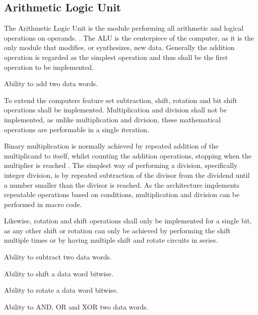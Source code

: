 \subsection{Arithmetic Logic Unit}
The Arithmetic Logic Unit is the module performing all arithmetic and logical operations on operands. \cite{vonneuman1945a}. The ALU is the centerpiece of the computer, as it is the only module that modifies, or synthesizes, new data.
Generally the addition operation is regarded as the simplest operation and thus shall be the first operation to be implemented.

\begin{turing-requirement}
  Ability to add two data words.
\end{turing-requirement}

To extend the computers feature set subtraction, shift, rotation and bit shift operations shall be implemented. Multiplication and division shall not be implemented, as unlike multiplication and division, these mathematical operations are performable in a single iteration. 

Binary multiplication is normally achieved by repeated addition of the multiplicand to itself, whilst counting the addition operations, stopping when the multiplier is reached \cite{cit.needed}. The simplest way of performing a division, specifically integer division, is by repeated subtraction of the divisor from the dividend until a number smaller than the divisor is reached.
As the architecture implements repeatable operations based on conditions, multiplication and division can be performed in macro code. 

Likewise, rotation and shift operations shall only be implemented for a single bit, as any other shift or rotation can only be achieved by performing the shift multiple times or by having multiple shift and rotate circuits in series. 

\begin{feat-requirement}
  Ability to subtract two data words.
\end{feat-requirement}

\begin{feat-requirement}
  Ability to shift a data word bitwise.
\end{feat-requirement}

\begin{feat-requirement}
  Ability to rotate a data word bitwise.
\end{feat-requirement}

\begin{feat-requirement}
  Ability to AND, OR and XOR two data words.
\end{feat-requirement}

